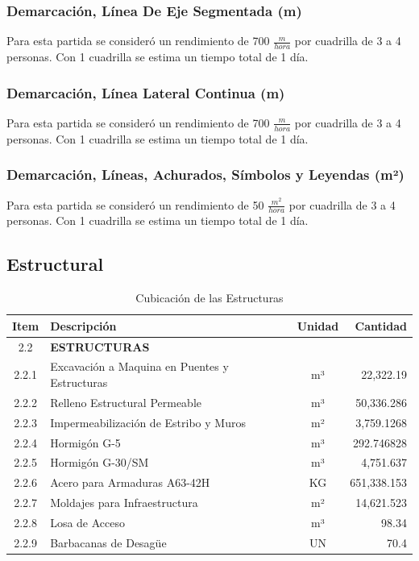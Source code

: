 \documentclass{article} %
\begin{document}
\subsubsection{Demarcación, Línea De Eje Segmentada (m)}
Para esta partida se consideró un rendimiento de 700 $\frac{m}{hora}$ por cuadrilla de 3 a 4 personas. Con 1 cuadrilla se estima un tiempo total de 1 día.

\subsubsection{Demarcación, Línea Lateral Continua (m)}
Para esta partida se consideró un rendimiento de 700 $\frac{m}{hora}$ por cuadrilla de 3 a 4 personas. Con 1 cuadrilla se estima un tiempo total de 1 día.

\subsubsection{Demarcación, Líneas, Achurados, Símbolos y Leyendas (m²)}
Para esta partida se consideró un rendimiento de 50 $\frac{m^2}{hora}$ por cuadrilla de 3 a 4 personas. Con 1 cuadrilla se estima un tiempo total de 1 día.

\subsection{Estructural}

\begin{table}[h!]
    \centering
    \begin{tabular}{|c|l|c|r|}
    \hline
    \textbf{Item} & \textbf{Descripción} & \textbf{Unidad} & \textbf{Cantidad} \\ \hline
    2.2 & \textbf{ESTRUCTURAS} & & \\ \hline
    2.2.1 & Excavación a Maquina en Puentes y Estructuras & m³ & 22,322.19 \\ \hline
    2.2.2 & Relleno Estructural Permeable & m³ & 50,336.286 \\ \hline
    2.2.3 & Impermeabilización de Estribo y Muros & m² & 3,759.1268 \\ \hline
    2.2.4 & Hormigón G-5 & m³ & 292.746828 \\ \hline
    2.2.5 & Hormigón G-30/SM & m³ & 4,751.637 \\ \hline
    2.2.6 & Acero para Armaduras A63-42H & KG & 651,338.153 \\ \hline
    2.2.7 & Moldajes para Infraestructura & m² & 14,621.523 \\ \hline
    2.2.8 & Losa de Acceso & m³ & 98.34 \\ \hline
    2.2.9 & Barbacanas de Desagüe & UN & 70.4 \\ \hline
    \end{tabular}
    \caption{Cubicación de las Estructuras}
\end{table}
\end{document}
